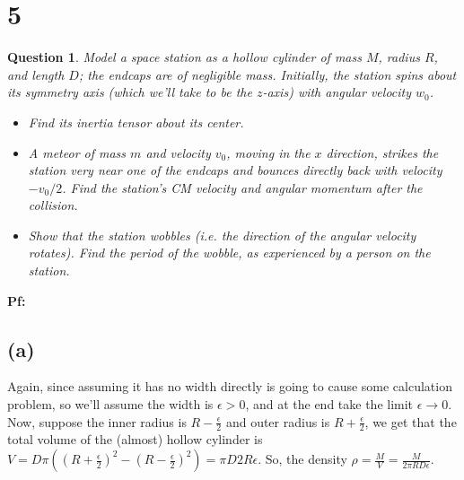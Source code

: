 \documentclass{article}
\newtheorem{question}{Question}
\begin{document}
\break

\section*{5}
\begin{question}\label{q5}
    Model a space station as a hollow cylinder of mass $M$, radius $R$, and length $D$; the endcaps are of negligible mass. Initially, the station spins about its symmetry axis (which we'll take to be the $z$-axis) with angular velocity $w_0$.
    \begin{itemize}
        \item[(a)] Find its inertia tensor about its center.
        \item[(b)] A meteor of mass $m$ and velocity $v_0$, moving in the $x$ direction, strikes the station very near one of the endcaps and bounces directly back with velocity $-v_0/2$. Find the station's CM velocity and angular momentum after the collision.
        \item[(c)] Show that the station wobbles (i.e. the direction of the angular velocity rotates). Find the period of the wobble, as experienced by a person on the station.  
    \end{itemize}
\end{question}

\textbf{Pf:}
\subsection*{(a)}
Again, since assuming it has no width directly is going to cause some calculation problem, so we'll assume the width is $\epsilon>0$, and at the end take the limit $\epsilon\rightarrow 0$. Now, suppose the inner radius is $R-\frac{\epsilon}{2}$ and outer radius is $R+\frac{\epsilon}{2}$, we get that the total volume of the (almost) hollow cylinder is $V=D\pi((R+\frac{\epsilon}{2})^2-(R-\frac{\epsilon}{2})^2) = \pi D2R\epsilon$. So, the density $\rho = \frac{M}{V}=\frac{M}{2\pi RD\epsilon}$.
\end{document}
